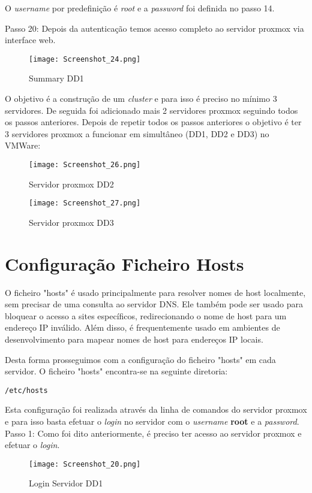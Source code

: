 O \textit{username} por predefinição é \textit{root} e a \textit{password} foi definida no passo 14.

\newpage
Passo 20: Depois da autenticação temos acesso completo ao servidor proxmox via interface web. 
\begin{figure}[H]
\center
\texttt{[image: Screenshot\_24.png]}
\caption{Summary DD1}
\end{figure}

O objetivo é a construção de um \textit{cluster} e para isso é preciso no mínimo 3 servidores. De seguida foi adicionado mais 2 servidores proxmox seguindo todos os passos anteriores.
Depois de repetir todos os passos anteriores o objetivo é ter 3 servidores proxmox a funcionar em simultâneo (DD1, DD2 e DD3) no VMWare:

\begin{figure}[H]
\center
\texttt{[image: Screenshot\_26.png]}
\caption{Servidor proxmox DD2}
\end{figure}

\newpage
\begin{figure}[H]
\center
\texttt{[image: Screenshot\_27.png]}
\caption{Servidor proxmox DD3}
\end{figure}

\newpage
\section{Configuração Ficheiro Hosts}
O ficheiro "hosts" é usado principalmente para resolver nomes de host localmente, sem precisar de uma consulta ao servidor \ac{DNS}. Ele também pode ser usado para bloquear o acesso a sites específicos, redirecionando o nome de host para um endereço \ac{IP} inválido. Além disso, é frequentemente usado em ambientes de desenvolvimento para mapear nomes de host para endereços IP locais.

Desta forma prosseguimos com a configuração do ficheiro "hosts" em cada servidor. O ficheiro "hosts" encontra-se na seguinte diretoria:
\begin{verbatim}/etc/hosts\end{verbatim}

Esta configuração foi realizada através da linha de comandos do servidor proxmox e para isso basta efetuar o \textit{login} no servidor com o \textit{username} \textbf{root} e a \textit{password}.\\

Passo 1: Como foi dito anteriormente, é preciso ter acesso ao servidor proxmox e efetuar o \textit{login}.  
\begin{figure}[H]
\center
\texttt{[image: Screenshot\_20.png]}
\caption{Login Servidor DD1}
\end{figure}

